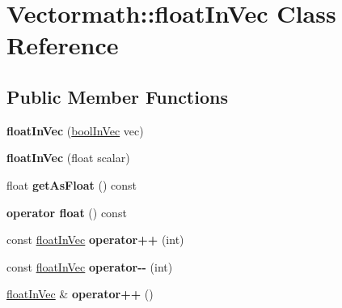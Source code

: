 \hypertarget{class_vectormath_1_1float_in_vec}{\section{Vectormath\+:\+:float\+In\+Vec Class Reference}
\label{class_vectormath_1_1float_in_vec}
}
\subsection*{Public Member Functions}
\begin{DoxyCompactItemize}
\item 
\hypertarget{class_vectormath_1_1float_in_vec_afaa5f27e47ae2f7c1eabfc721b2619bb}{{\bfseries float\+In\+Vec} (\hyperlink{class_vectormath_1_1bool_in_vec}{bool\+In\+Vec} vec)}\label{class_vectormath_1_1float_in_vec_afaa5f27e47ae2f7c1eabfc721b2619bb}

\item 
\hypertarget{class_vectormath_1_1float_in_vec_a0d9fe72973e2d8393e29bc5891fc0549}{{\bfseries float\+In\+Vec} (float scalar)}\label{class_vectormath_1_1float_in_vec_a0d9fe72973e2d8393e29bc5891fc0549}

\item 
\hypertarget{class_vectormath_1_1float_in_vec_a2f59a1d380fd3990ba8881dc75de19bf}{float {\bfseries get\+As\+Float} () const }\label{class_vectormath_1_1float_in_vec_a2f59a1d380fd3990ba8881dc75de19bf}

\item 
\hypertarget{class_vectormath_1_1float_in_vec_adf55ff2bb10f7412fc5862e55ec8be48}{{\bfseries operator float} () const }\label{class_vectormath_1_1float_in_vec_adf55ff2bb10f7412fc5862e55ec8be48}

\item 
\hypertarget{class_vectormath_1_1float_in_vec_adf90abe101b93990227e5e7ea879bdb7}{const \hyperlink{class_vectormath_1_1float_in_vec}{float\+In\+Vec} {\bfseries operator++} (int)}\label{class_vectormath_1_1float_in_vec_adf90abe101b93990227e5e7ea879bdb7}

\item 
\hypertarget{class_vectormath_1_1float_in_vec_a73b9b6bb31e6e833de65a797e3d45dba}{const \hyperlink{class_vectormath_1_1float_in_vec}{float\+In\+Vec} {\bfseries operator-\/-\/} (int)}\label{class_vectormath_1_1float_in_vec_a73b9b6bb31e6e833de65a797e3d45dba}

\item 
\hypertarget{class_vectormath_1_1float_in_vec_a8809092da8cc4515717703ce9a405621}{\hyperlink{class_vectormath_1_1float_in_vec}{float\+In\+Vec} \& {\bfseries operator++} ()}\label{class_vectormath_1_1float_in_vec_a8809092da8cc4515717703ce9a405621}


\end{DoxyCompactItemize}

